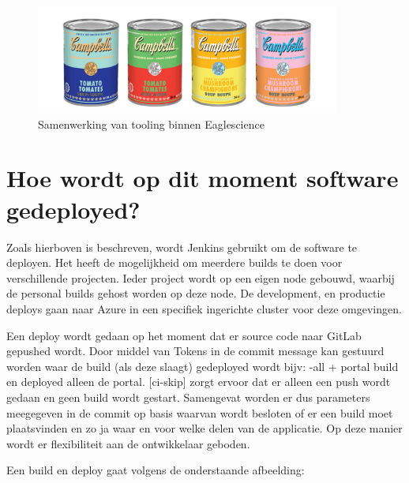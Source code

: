 \begin{itemize}
    \begin{figure}
        \centering
        \includegraphics[width=10cm]{gfx/soupcans}
        \caption{Samenwerking van tooling binnen Eaglescience}
        \label{fig:es-tooling}
    \end{figure}

\end{itemize}


\section{Hoe wordt op dit moment software gedeployed?} \label{sec:hoe-wordt-op-dit-moment-software-gedeployed?}
Zoals hierboven is beschreven, wordt Jenkins gebruikt om de software te deployen. Het heeft de mogelijkheid om meerdere builds te doen voor verschillende projecten. Ieder project wordt op een eigen node gebouwd, waarbij de personal builds gehost worden op deze node. De development, en productie deploys gaan naar Azure in een specifiek ingerichte cluster voor deze omgevingen.

Een deploy wordt gedaan op het moment dat er source code naar GitLab gepushed wordt. Door middel van Tokens in de commit message kan gestuurd worden waar de build (als deze slaagt) gedeployed wordt bijv: {-all + portal} build en deployed alleen de portal. [ci-skip] zorgt ervoor dat er alleen een push wordt gedaan en geen build wordt gestart.
Samengevat worden er dus parameters meegegeven in de commit op basis waarvan wordt besloten of er een build moet plaatsvinden en zo ja waar en voor welke delen van de applicatie. Op deze manier wordt er flexibiliteit aan de ontwikkelaar geboden.

Een build en deploy gaat volgens de onderstaande afbeelding:

